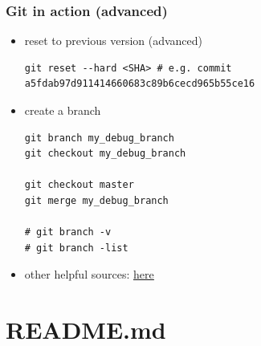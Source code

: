 \documentclass{beamer}
\begin{document}
\begin{frame}[fragile]
\frametitle{Git in action (advanced)}

\begin{itemize}

\item reset to previous version (advanced)
\tiny
\begin{verbatim}
git reset --hard <SHA> # e.g. commit a5fdab97d911414660683c89b6cecd965b55ce16
\end{verbatim}
\normalsize

\item create a branch
\tiny
\begin{verbatim}
git branch my_debug_branch
git checkout my_debug_branch

git checkout master
git merge my_debug_branch

# git branch -v
# git branch -list
\end{verbatim}
\normalsize

\item other helpful sources: \href{https://github.com/allenwhm/git-in-action#what-is-git}{\underline{here}}

\end{itemize}
\end{frame}













\section{README.md}
\end{document}
